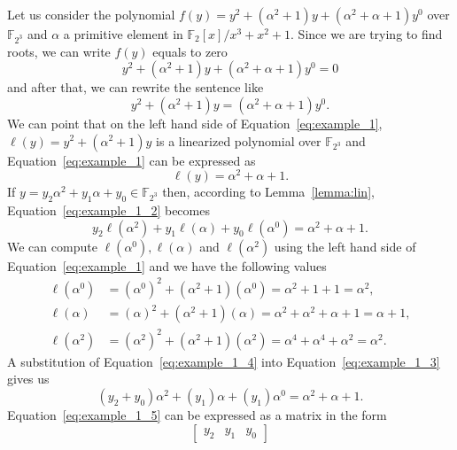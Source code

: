 \begin{example}\label{ex:1}
Let us consider the polynomial $f(y) = y^2 + (\alpha^2+1)y + (\alpha^2 +\alpha +1)y^0$ over $\mathbb{F}_{2^3}$ and $\alpha$ a primitive element in $\mathbb{F}_2[x]/ x^3+x^2+1$. Since we are trying to find roots, we can write $f(y)$ equals to zero
 $$ y^2 + (\alpha^2+1)y + (\alpha^2 +\alpha +1)y^0 = 0$$
 and after that, we can rewrite the sentence like
\begin{equation}\label{eq:example_1}
    y^2 + (\alpha^2+1)y   = (\alpha^2 +\alpha +1)y^0.
\end{equation}
We can point that on the left hand side of Equation~\ref{eq:example_1}, $\ell(y) = y^2 + (\alpha^2+1)y$ is a linearized polynomial over $\mathbb{F}_{2^3}$ and Equation~\ref{eq:example_1} can be expressed as
\begin{equation}\label{eq:example_1_2}
    \ell(y) = \alpha^2 +\alpha +1.
\end{equation}
If $y = y_2\alpha^2 + y_1\alpha + y_0 \in \mathbb{F}_{2^3}$ then, according to Lemma~\ref{lemma:lin}, Equation~\ref{eq:example_1_2} becomes
\begin{equation}\label{eq:example_1_3}
    y_2\ell(\alpha^2) + y_1\ell(\alpha) + y_0\ell(\alpha^0) = \alpha^2 +\alpha +1.
\end{equation}
We can compute $\ell(\alpha^0),\ell(\alpha)$ and $\ell(\alpha^2)$ using the left hand side of Equation~\ref{eq:example_1} and we have the following values
\begin{equation}\label{eq:example_1_4}
    \begin{split}
        \ell(\alpha^0) & = (\alpha^0)^2 + (\alpha^2+1)(\alpha^0) = \alpha^2+1 + 1 = \alpha^2, \\
        \ell(\alpha) & = (\alpha)^2 + (\alpha^2+1)(\alpha) = \alpha^2 + \alpha^2+ \alpha + 1 = \alpha + 1, \\
        \ell(\alpha^2) & = (\alpha^2)^2 + (\alpha^2+1)(\alpha^2) = \alpha^4 +\alpha^4 +  \alpha^2 = \alpha^2.
    \end{split}
\end{equation}
A substitution of Equation~\ref{eq:example_1_4} into Equation~\ref{eq:example_1_3} gives us
\begin{equation}\label{eq:example_1_5}
     (y_2+y_0)\alpha^2 + (y_1)\alpha + (y_1)\alpha^0 = \alpha^2 +\alpha +1.
\end{equation}
Equation~\ref{eq:example_1_5} can be expressed as a matrix in the form
\begin{equation}\label{eq:example_1_6}
    \begin{bmatrix} y_2 & y_1 & y_0 \end{bmatrix}

\end{equation}
\end{example}
